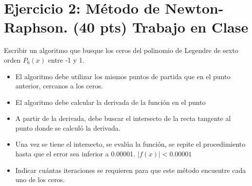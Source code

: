 \documentclass{article}
\begin{document}
\section{Ejercicio 2: Método de Newton-Raphson. (40 pts) Trabajo en Clase}

Escribir un algoritmo que busque los ceros del polinomio de Legendre
de sexto orden $P_6(x)$ entre -1 y 1.

\begin{itemize}
\item El algoritmo debe utilizar los mismos puntos de partida que en el
  punto anterior, cercanos a los ceros.
\item El algoritmo debe calcular la derivada de la función en el punto
\item A partir de la derivada, debe buscar el intersecto de la recta tangente
  al punto donde se calculó la derivada.
\item Una vez se tiene el intersecto, se evalúa la función, se repite el
  procedimiento hasta que el error sea inferior a 0.00001.
  $|f(x)| < 0.00001$
\item Indicar cuántas iteraciones se requieren para que este método
  encuentre cada uno de los ceros.
\end{itemize}
\end{document}
